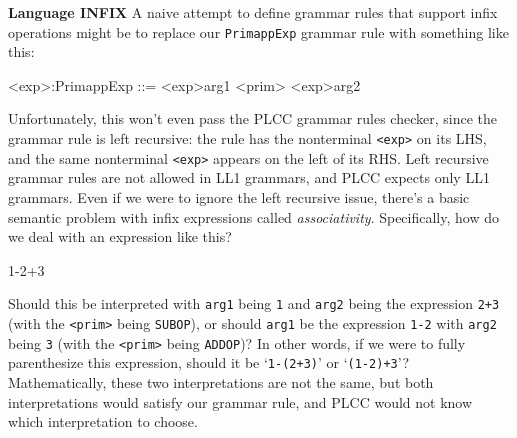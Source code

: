 \begin{minipage}[t]{\sw}
\slidenumber
\LARGE
{\bf Language INFIX}\exx
A naive attempt to define grammar rules that support infix operations might be
to replace our \verb'PrimappExp' grammar rule with something like this:
\begin{qv}
<exp>:PrimappExp  ::= <exp>arg1 <prim> <exp>arg2
\end{qv}
Unfortunately, this won't even pass the PLCC grammar rules checker,
since the grammar rule is left recursive:
the rule has the nonterminal \verb'<exp>' on its LHS,
and the same nonterminal \verb'<exp>' appears
on the left of its RHS.
Left recursive grammar rules are not allowed in LL1 grammars,
and PLCC expects only LL1 grammars.\exx
Even if we were to ignore the left recursive issue,
there's a basic semantic problem with infix expressions
called {\em associativity}.
Specifically, how do we deal with an expression like this?
\begin{qv}
1-2+3
\end{qv}
Should this be interpreted with \verb'arg1' being \verb'1'
and \verb'arg2' being the expression \verb'2+3'
(with the \verb'<prim>' being \verb'SUBOP'),
or should \verb'arg1' be the expression \verb'1-2'
with \verb'arg2' being \verb'3'
(with the \verb'<prim>' being \verb'ADDOP')?
In other words, if we were to fully parenthesize this expression,
should it be `\verb'1-(2+3)'' or `\verb'(1-2)+3''?
Mathematically, these two interpretations are not the same,
but both interpretations would satisfy our grammar rule,
and PLCC would not know which interpretation to choose.
\end{minipage}
